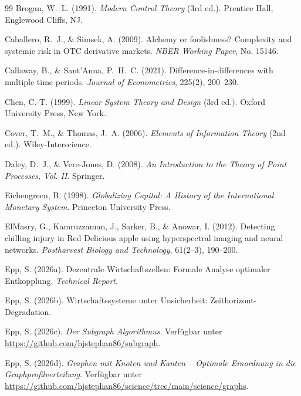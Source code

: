 \documentclass[a4paper, 12pt, twoside, openright]{report}
\theoremstyle{definition}
\theoremstyle{definition}
\begin{document}
\begin{thebibliography}{99}
Brogan, W.~L. (1991).
\newblock \emph{Modern Control Theory} (3rd ed.).
\newblock Prentice Hall, Englewood Cliffs, NJ.

Caballero, R.~J., \& Simsek, A. (2009).
\newblock Alchemy or foolishness? Complexity and systemic risk in OTC derivative markets.
\newblock \emph{NBER Working Paper}, No. 15146.

Callaway, B., \& Sant'Anna, P.~H.~C. (2021).
\newblock Difference-in-differences with multiple time periods.
\newblock \emph{Journal of Econometrics}, 225(2), 200--230.

Chen, C.-T. (1999).
\newblock \emph{Linear System Theory and Design} (3rd ed.).
\newblock Oxford University Press, New York.

Cover, T.~M., \& Thomas, J.~A. (2006).
\newblock \emph{Elements of Information Theory} (2nd ed.).
\newblock Wiley-Interscience.

Daley, D.~J., \& Vere-Jones, D. (2008).
\newblock \emph{An Introduction to the Theory of Point Processes, Vol. II}.
\newblock Springer.

Eichengreen, B. (1998).
\newblock \emph{Globalizing Capital: A History of the International Monetary System}.
\newblock Princeton University Press.

ElMasry, G., Kamruzzaman, J., Sarker, B., \& Anowar, I. (2012).
\newblock Detecting chilling injury in Red Delicious apple using hyperspectral imaging and neural networks.
\newblock \emph{Postharvest Biology and Technology}, 61(2--3), 190--200.

Epp, S. (2026a).
\newblock Dezentrale Wirtschaftszellen: Formale Analyse optimaler Entkopplung.
\newblock \emph{Technical Report}.

Epp, S. (2026b).
\newblock Wirtschaftssysteme unter Unsicherheit: Zeithorizont-Degradation.

Epp, S. (2026c).
\newblock \emph{Der Subgraph Algorithmus}. Verfügbar unter \url{https://github.com/hjstephan86/subgraph}.

Epp, S. (2026d).
\newblock \emph{Graphen mit Knoten und Kanten -- Optimale Einordnung in die Graphprofilverteilung}. Verfügbar unter \url{https://github.com/hjstephan86/science/tree/main/science/graphs}.


\end{thebibliography}
\end{document}

